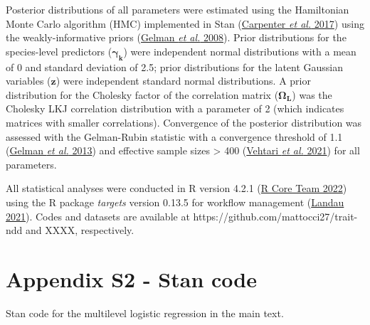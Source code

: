\documentclass[
  12pt,
  letterpaper,
  DIV=11,
  numbers=noendperiod]{scrartcl}
\begin{document}
Posterior distributions of all parameters were estimated using the
Hamiltonian Monte Carlo algorithm (HMC) implemented in Stan
(\protect\hyperlink{ref-Carpenter2017}{Carpenter \emph{et al.} 2017})
using the weakly-informative priors
(\protect\hyperlink{ref-Gelman2008}{Gelman \emph{et al.} 2008}). Prior
distributions for the species-level predictors
(\(\boldsymbol{\gamma_k}\)) were independent normal distributions with a
mean of 0 and standard deviation of 2.5; prior distributions for the
latent Gaussian variables (\(\boldsymbol{z}\)) were independent standard
normal distributions. A prior distribution for the Cholesky factor of
the correlation matrix (\(\boldsymbol{\Omega_L}\)) was the Cholesky LKJ
correlation distribution with a parameter of 2 (which indicates matrices
with smaller correlations). Convergence of the posterior distribution
was assessed with the Gelman-Rubin statistic with a convergence
threshold of 1.1 (\protect\hyperlink{ref-Gelman2013}{Gelman \emph{et
al.} 2013}) and effective sample sizes \textgreater{} 400
(\protect\hyperlink{ref-Vehtari2021}{Vehtari \emph{et al.} 2021}) for
all parameters.

All statistical analyses were conducted in R version 4.2.1
(\protect\hyperlink{ref-RCoreTeam2022}{R Core Team 2022}) using the R
package \emph{targets} version 0.13.5 for workflow management
(\protect\hyperlink{ref-Landau2021}{Landau 2021}). Codes and datasets
are available at https://github.com/mattocci27/trait-ndd and XXXX,
respectively.

\newpage

\hypertarget{appendix-s2---stan-code}{%
\section{Appendix S2 - Stan code}\label{appendix-s2---stan-code}}

Stan code for the multilevel logistic regression in the main text.
\end{document}
